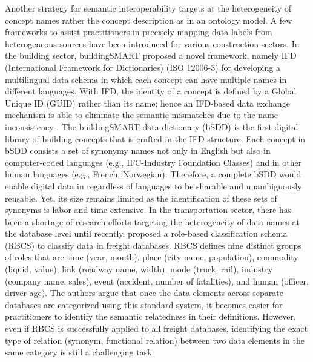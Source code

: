\documentclass[Journal, BackFigs,NoLists, DoubleSpace]{ascelike}%
\begin{document}
Another strategy for semantic interoperability targets at the heterogeneity of concept names rather the concept description as in an ontology model. A few frameworks to assist practitioners in precisely mapping data labels from heterogeneous sources have been introduced for various construction sectors. In the building sector, buildingSMART proposed a novel framework, namely IFD (International Framework for Dictionaries) (ISO 12006-3) for developing a multilingual data schema in which each concept can have multiple names in different languages. With IFD, the identity of a concept is defined by a Global Unique ID (GUID) rather than its name; hence an IFD-based data exchange mechanism is able to eliminate the semantic mismatches due to the name inconsistency \cite{IFDgroup08,hezik08}. The buildingSMART data dictionary (bSDD) \cite{buildingsmartData} is the first digital library of building concepts that is crafted in the IFD structure. Each concept in bSDD consists a set of synonymy names not only in English but also in computer-coded languages (e.g., IFC-Industry Foundation Classes) and in other human languages (e.g., French, Norwegian). Therefore, a complete bSDD would enable digital data in regardless of languages to be sharable and unambiguously reusable. Yet, its size remains limited as the identification of these sets of synonyms is labor and time extensive. In the transportation sector, there has been a shortage of research efforts targeting the heterogeneity of data names at the database level until recently.   proposed a role-based classification schema (RBCS) to classify data in freight databases. RBCS defines nine distinct groups of roles that are time (year, month), place (city name, population), commodity (liquid, value), link (roadway name, width), mode (truck, rail), industry (company name, sales), event (accident, number of fatalities), and human (officer, driver age). The authors argue that once the data elements across separate databases are categorized using this standard system, it becomes easier for practitioners to identify the semantic relatedness in their definitions. However, even if RBCS is successfully applied to all freight databases, identifying the exact type of relation (synonym, functional relation) between two data elements in the same category is still a challenging task.
\par
\end{document}
